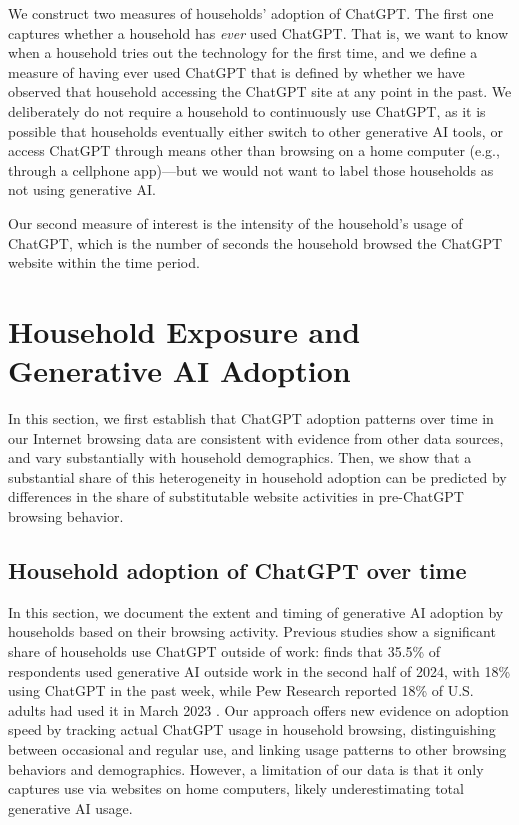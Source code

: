 \documentclass[12pt]{article}
\begin{document}
We construct two measures of households' adoption of ChatGPT.  The first one captures whether a household has \textit{ever} used ChatGPT. That is, we want to know when a household tries out the technology for the first time, and we define a measure of having ever used ChatGPT that is defined by whether we have observed that household accessing the ChatGPT site at any point in the past. We deliberately do not require a household to continuously use ChatGPT, as it is possible that households eventually either switch to other generative AI tools, or access ChatGPT through means other than browsing on a home computer (e.g., through a cellphone app)---but we would not want to label those households as not using generative AI.

Our second measure of interest is the intensity of the household's usage of ChatGPT, which is the number of seconds the household browsed the ChatGPT website within the time period. 


\section{Household Exposure and Generative AI Adoption} \label{sec:measure_adoption}

In this section, we first establish that ChatGPT adoption patterns over time in our Internet browsing data are consistent with evidence from other data sources, and vary substantially with household demographics. Then, we show that a substantial share of this heterogeneity in household adoption can be predicted by differences in the share of substitutable website activities in pre-ChatGPT browsing behavior.


\subsection{Household adoption of ChatGPT over time} 


In this section, we document the extent and timing of generative AI adoption by households based on their browsing activity. Previous studies show a significant share of households use ChatGPT outside of work: \cite{bick2024} finds that 35.5\% of respondents used generative AI outside work in the second half of 2024, with 18\% using ChatGPT in the past week, while Pew Research reported 18\% of U.S. adults had used it in March 2023 \citep{pewresearch2025}. Our approach offers new evidence on adoption speed by tracking actual ChatGPT usage in household browsing, distinguishing between occasional and regular use, and linking usage patterns to other browsing behaviors and demographics. However, a limitation of our data is that it only captures use via websites on home computers, likely underestimating total generative AI usage.
\end{document}
